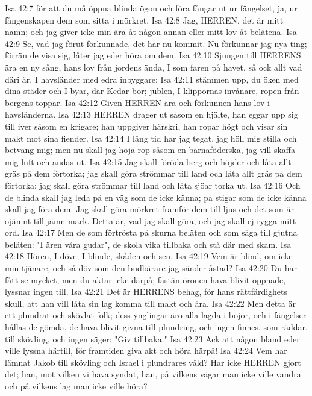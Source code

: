 Isa 42:7  för att du må öppna blinda ögon och föra fångar ut ur fängelset, ja, ur fångenskapen dem som sitta i mörkret.
Isa 42:8  Jag, HERREN, det är mitt namn; och jag giver icke min ära åt någon annan eller mitt lov åt belätena.
Isa 42:9  Se, vad jag förut förkunnade, det har nu kommit. Nu förkunnar jag nya ting; förrän de visa sig, låter jag eder höra om dem.
Isa 42:10  Sjungen till HERRENS ära en ny sång, hans lov från jordens ända, I som faren på havet, så ock allt vad däri är, I havsländer med edra inbyggare;
Isa 42:11  stämmen upp, du öken med dina städer och I byar, där Kedar bor; jublen, I klippornas invånare, ropen från bergens toppar.
Isa 42:12  Given HERREN ära och förkunnen hans lov i havsländerna.
Isa 42:13  HERREN drager ut såsom en hjälte, han eggar upp sig till iver såsom en krigare; han uppgiver härskri, han ropar högt och visar sin makt mot sina fiender.
Isa 42:14  I lång tid har jag tegat, jag höll mig stilla och betvang mig; men nu skall jag höja rop såsom en barnaföderska, jag vill skaffa mig luft och andas ut.
Isa 42:15  Jag skall föröda berg och höjder och låta allt gräs på dem förtorka; jag skall göra strömmar till land och låta allt gräs på dem förtorka; jag skall göra strömmar till land och låta sjöar torka ut.
Isa 42:16  Och de blinda skall jag leda på en väg som de icke känna; på stigar som de icke känna skall jag föra dem. Jag skall göra mörkret framför dem till ljus och det som är ojämnt till jämn mark. Detta är, vad jag skall göra, och jag skall ej rygga mitt ord.
Isa 42:17  Men de som förtrösta på skurna beläten och som säga till gjutna beläten: "I ären våra gudar", de skola vika tillbaka och stå där med skam.
Isa 42:18  Hören, I döve; I blinde, skåden och sen.
Isa 42:19  Vem är blind, om icke min tjänare, och så döv som den budbärare jag sänder åstad?
Isa 42:20  Du har fått se mycket, men du aktar icke därpå; fastän öronen hava blivit öppnade, lyssnar ingen till.
Isa 42:21  Det är HERRENS behag, för hans rättfärdighets skull, att han vill låta sin lag komma till makt och ära.
Isa 42:22  Men detta är ett plundrat och skövlat folk; dess ynglingar äro alla lagda i bojor, och i fängelser hållas de gömda, de hava blivit givna till plundring, och ingen finnes, som räddar, till skövling, och ingen säger: "Giv tillbaka."
Isa 42:23  Ack att någon bland eder ville lyssna härtill, för framtiden giva akt och höra härpå!
Isa 42:24  Vem har lämnat Jakob till skövling och Israel i plundrares våld? Har icke HERREN gjort det; han, mot vilken vi hava syndat, han, på vilkens vägar man icke ville vandra och på vilkens lag man icke ville höra?
